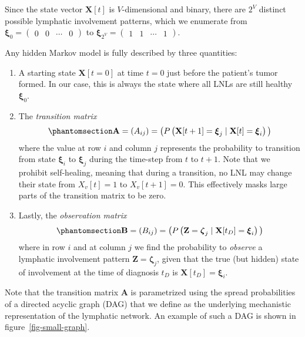 \documentclass[
  sn-mathphys-num,
]{sn-jnl}
\providecommand{\tightlist}{%
  \setlength{\itemsep}{0pt}\setlength{\parskip}{0pt}}\usepackage{longtable,booktabs,array}
\begin{document}
Since the state vector \(\mathbf{X}[t]\) is \(V\)-dimensional and
binary, there are \(2^V\) distinct possible lymphatic involvement
patterns, which we enumerate from
\(\boldsymbol{\xi}_0 = \begin{pmatrix} 0 & 0 & \cdots & 0 \end{pmatrix}\)
to
\(\boldsymbol{\xi}_{2^V} = \begin{pmatrix} 1 & 1 & \cdots & 1 \end{pmatrix}\).

Any hidden Markov model is fully described by three quantities:

\begin{enumerate}
\def\labelenumi{\arabic{enumi}.}
\tightlist
\item
  A starting state \(\mathbf{X}[t=0]\) at time \(t=0\) just before the
  patient's tumor formed. In our case, this is always the state where
  all LNLs are still healthy \(\boldsymbol{\xi}_0\).
\item
  The \emph{transition matrix}
  \begin{equation}\phantomsection\label{eq-trans-matrix}{
  \mathbf{A} = \left( A_{ij} \right) = \big( P \left( \mathbf{X}[t+1] = \boldsymbol{\xi}_j \mid \mathbf{X}[t] = \boldsymbol{\xi}_i \right) \big)
  }\end{equation} where the value at row \(i\) and column \(j\)
  represents the probability to transition from state
  \(\boldsymbol{\xi}_i\) to \(\boldsymbol{\xi}_j\) during the time-step
  from \(t\) to \(t+1\). Note that we prohibit self-healing, meaning
  that during a transition, no LNL may change their state from
  \(X_v[t]=1\) to \(X_v[t+1]=0\). This effectively masks large parts of
  the transition matrix to be zero.
\item
  Lastly, the \emph{observation matrix}
  \begin{equation}\phantomsection\label{eq-obs-matrix}{
  \mathbf{B} = \left( B_{ij} \right) = \big( P \left( \mathbf{Z} = \boldsymbol{\zeta}_j \mid \mathbf{X}[t_D] = \boldsymbol{\xi}_i \right) \big)
  }\end{equation} where in row \(i\) and at column \(j\) we find the
  probability to \emph{observe} a lymphatic involvement pattern
  \(\mathbf{Z} = \boldsymbol{\zeta}_j\), given that the true (but
  hidden) state of involvement at the time of diagnosis \(t_D\) is
  \(\mathbf{X}[t_D] = \boldsymbol{\xi}_i\).
\end{enumerate}

Note that the transition matrix \(\mathbf{A}\) is parametrized using the
spread probabilities of a directed acyclic graph (DAG) that we define as
the underlying mechanistic representation of the lymphatic network. An
example of such a DAG is shown in figure~\ref{fig-small-graph}.
\end{document}
